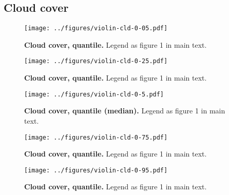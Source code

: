 \documentclass[12pt]{report}
\begin{document}
\subsection{Cloud cover}
\begin{figure}[h!]
  \begin{center}
    \texttt{[image: ../figures/violin-cld-0-05.pdf]}
  \end{center}
  \caption{\textbf{Cloud cover,  quantile.} Legend as
    figure 1 in main text.}
\end{figure}
\begin{figure}[h!]
  \begin{center}
    \texttt{[image: ../figures/violin-cld-0-25.pdf]}
  \end{center}
  \caption{\textbf{Cloud cover,  quantile.} Legend as
    figure 1 in main text.}
\end{figure}
\begin{figure}[h!]
  \begin{center}
    \texttt{[image: ../figures/violin-cld-0-5.pdf]}
  \end{center}
  \caption{\textbf{Cloud cover,  quantile (median).}
    Legend as figure 1 in main text.}
\end{figure}
\begin{figure}[h!]
  \begin{center}
    \texttt{[image: ../figures/violin-cld-0-75.pdf]}
  \end{center}
  \caption{\textbf{Cloud cover,  quantile.} Legend as
    figure 1 in main text.}
\end{figure}
\begin{figure}[h!]
  \begin{center}
    \texttt{[image: ../figures/violin-cld-0-95.pdf]}
  \end{center}
  \caption{\textbf{Cloud cover,  quantile.} Legend as
    figure 1 in main text.}
\end{figure}

\clearpage
\end{document}

